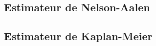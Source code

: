 \documentclass[french, landscape]{article}
\begin{document}
\begin{multicols*}{3}
\subsection*{Estimateur de Nelson-Aalen}

\subsection*{Estimateur de Kaplan-Meier}


\end{multicols*}
\end{document}

